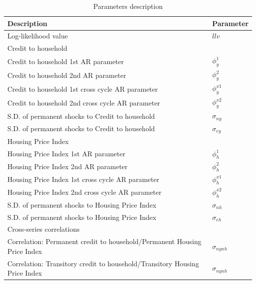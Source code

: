 \documentclass[
  12pt,
]{article}
\begin{document}
        \begin{table}[H]
            \begin{threeparttable}
                \caption {\label{tab:table1} Parameters description}
                \begin{tabular}{@{}ll@{}}
                    \toprule
                    Description & Parameter\\
                    \midrule
                    Log-likelihood value & $llv$ \\[2pt] 
                    Credit to household & \\
                    \quad Credit to household 1st AR parameter  & $\phi^1_{y}$ \\[2pt] 
                    \quad Credit to household 2nd AR parameter  & $\phi^2_{y}$ \\[2pt] 
                    \quad Credit to household 1st cross cycle AR parameter  & $\phi^{x1}_{y}$ \\[2pt] 
                    \quad Credit to household 2nd cross cycle AR parameter  & $\phi^{x2}_{y}$ \\[2pt] 
                    \quad S.D. of permanent shocks to Credit to household & $\sigma_{ny}$ \\[2pt] 
                    \quad S.D. of permanent shocks to Credit to household & $\sigma_{ey}$ \\[2pt]
                    Housing Price Index & \\
                    \quad Housing Price Index 1st AR parameter  & $\phi^1_{h}$ \\[2pt] 
                    \quad Housing Price Index 2nd AR parameter  & $\phi^2_{h}$ \\[2pt] 
                    \quad Housing Price Index 1st cross cycle AR parameter  & $\phi^{x1}_{h}$ \\[2pt] 
                    \quad Housing Price Index 2nd cross cycle AR parameter  & $\phi^{x2}_{h}$ \\[2pt] 
                    \quad S.D. of permanent shocks to Housing Price Index & $\sigma_{nh}$ \\[2pt] 
                    \quad S.D. of permanent shocks to Housing Price Index & $\sigma_{eh}$ \\[2pt]
                    Cross-series correlations & \\
                    \quad Correlation: Permanent credit to household/Permanent Housing Price Index  & $\sigma_{nynh}$ \\[2pt] 
                    \quad Correlation: Transitory credit to household/Transitory Housing Price Index  & $\sigma_{nynh}$ \\[2pt] 
                                        

\end{tabular}
\end{threeparttable}
\end{table}
\end{document}
